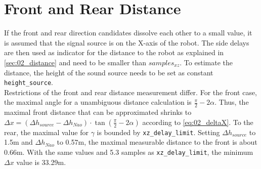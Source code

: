 \section{Front and Rear Distance}
\label{sec:03_distance}

If the front and rear direction candidates dissolve each other to a small
value, it is assumed that the signal source is on the X-axis of the robot.
The side delays are then used as indicator for the distance to the robot as
explained in \ref{sec:02_distance} and need to be smaller than
 $samples_{xz}$.
To estimate the distance, the height of the sound source needs to be set as
constant  \lstinline!height_source!.\\
Restrictions of the front and rear distance measurement differ.
For the front case, the maximal angle for a unambiguous distance calculation
is $\frac{\pi}{2}- 2\alpha$.
Thus, the maximal front distance that can be approximated shrinks to
$\Delta x = (\Delta h_{source} - \Delta h_{Nao}) \cdot \tan(\frac{\pi}{2} - 2\alpha)$
according to \ref{eq:02_deltaX}.
To the rear, the maximal value for $\gamma$ is bounded by 
\lstinline!xz_delay_limit!.
Setting $\Delta h_{source}$ to 1.5\si{m} and $\Delta h_{Nao}$ to 0.57\si{m},
the maximal measurable distance to the front is about 0.66\si{m}.
With the same values and 5.3 samples as \lstinline!xz_delay_limit!, the
minimum $\Delta x$ value is 33.29\si{m}.
